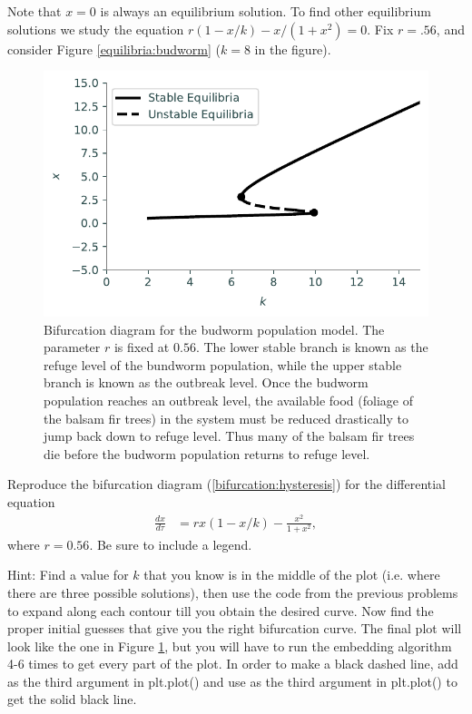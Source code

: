 Note that $x = 0$ is always an equilibrium solution.
To find other equilibrium solutions we study the equation $r(1-x/k)-x/(1+x^2) = 0$.
Fix $r = .56$, and consider Figure \eqref{equilibria:budworm} ($k=8$ in the figure).

\newpage
\begin{figure}
\centering
\includegraphics[width=\textwidth]{figures/BudwormPopulation.pdf}
\caption{Bifurcation diagram for the budworm population model.
The parameter $r$ is fixed at $0.56.$
The lower stable branch is known as the refuge level of the bundworm population, while the upper stable branch is known as the outbreak level.
Once the budworm population reaches an outbreak level, the available food (foliage of the balsam fir trees) in the system must be reduced drastically to jump back down to refuge level.
Thus many of the balsam fir trees die before the budworm population returns to refuge level.}
\label{bifurcation:budworm}
\end{figure}

\newpage
\begin{problem} %
Reproduce the bifurcation diagram (\ref{bifurcation:hysteresis}) for the differential equation
\begin{align*}
	\frac{dx}{d \tau} &= rx(1-x/k) - \frac{x^2}{1+x^2},
\end{align*}
where $r = 0.56$.
Be sure to include a legend.

Hint: Find a value for $k$ that you know is in the middle of the plot (i.e. where there are three possible solutions), then use the code from the previous problems to expand along each contour till you obtain the desired curve.
Now find the proper initial guesses that give you the right bifurcation curve.
The final plot will look like the one in Figure \ref{bifurcation:budworm}, but you will have to run the embedding algorithm 4-6 times to get every part of the plot. In order to make a black dashed line, add  as the third argument in plt.plot() and use  as the third argument in plt.plot() to get the solid black line.
\end{problem} 

